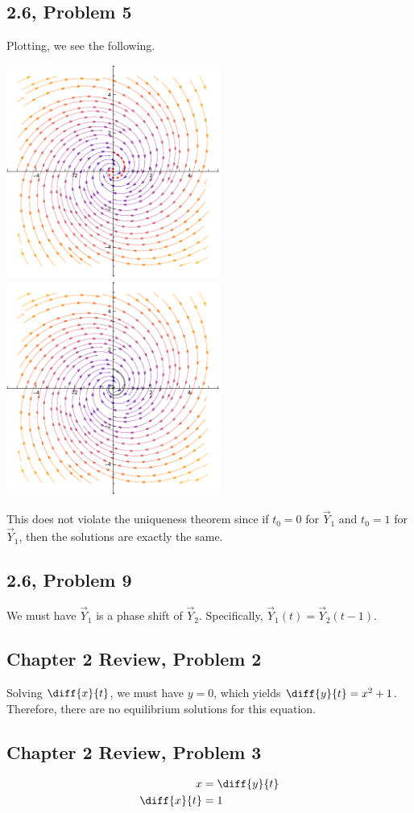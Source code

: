 \documentclass[10pt]{mypackage}
\begin{document}
\subsection{2.6, Problem 5}%
Plotting, we see the following.
\begin{center}
  \includegraphics[width=7cm]{images/2_6_5a.pdf} \includegraphics[width=7cm]{images/2_6_5b.pdf}
\end{center}
This does not violate the uniqueness theorem since if $t_0 = 0$ for $\vec{Y}_1$ and $t_0 = 1$ for $\vec{Y}_1$, then the solutions are exactly the same.
\subsection{2.6, Problem 9}%
We must have $\vec{Y}_1$ is a phase shift of $\vec{Y}_2$. Specifically, $\vec{Y}_1(t) = \vec{Y}_2(t-1)$.
\subsection{Chapter 2 Review, Problem 2}%
Solving $\diff{x}{t}$, we must have $y=0$, which yields $\diff{y}{t} = x^2 + 1$. Therefore, there are no equilibrium solutions for this equation.
\subsection{Chapter 2 Review, Problem 3}%
\begin{align*}
  x &= \diff{y}{t}\\
  \diff{x}{t} &= 1
\end{align*}
\end{document}
